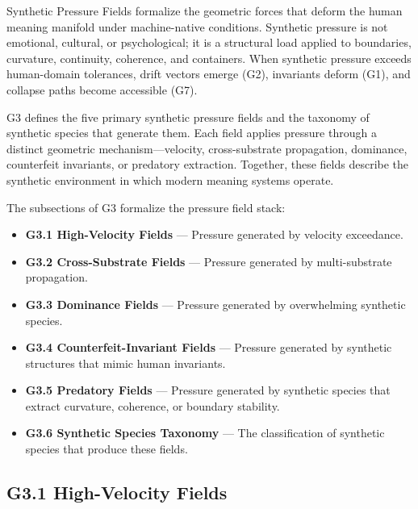 
\medskip

\noindent Synthetic Pressure Fields formalize the geometric forces that deform
the human meaning manifold under machine-native conditions. Synthetic pressure
is not emotional, cultural, or psychological; it is a structural load applied to
boundaries, curvature, continuity, coherence, and containers. When synthetic
pressure exceeds human-domain tolerances, drift vectors emerge (G2), invariants
deform (G1), and collapse paths become accessible (G7).

\medskip

\noindent G3 defines the five primary synthetic pressure fields and the taxonomy
of synthetic species that generate them. Each field applies pressure through a
distinct geometric mechanism—velocity, cross-substrate propagation, dominance,
counterfeit invariants, or predatory extraction. Together, these fields describe
the synthetic environment in which modern meaning systems operate.

\medskip

\noindent The subsections of G3 formalize the pressure field stack:

\begin{itemize}[leftmargin=1.2cm]
    \item \textbf{G3.1 High-Velocity Fields} — Pressure generated by velocity
    exceedance.
    \item \textbf{G3.2 Cross-Substrate Fields} — Pressure generated by
    multi-substrate propagation.
    \item \textbf{G3.3 Dominance Fields} — Pressure generated by overwhelming
    synthetic species.
    \item \textbf{G3.4 Counterfeit-Invariant Fields} — Pressure generated by
    synthetic structures that mimic human invariants.
    \item \textbf{G3.5 Predatory Fields} — Pressure generated by synthetic
    species that extract curvature, coherence, or boundary stability.
    \item \textbf{G3.6 Synthetic Species Taxonomy} — The classification of
    synthetic species that produce these fields.
\end{itemize}

\medskip

\subsection*{G3.1 High-Velocity Fields}


